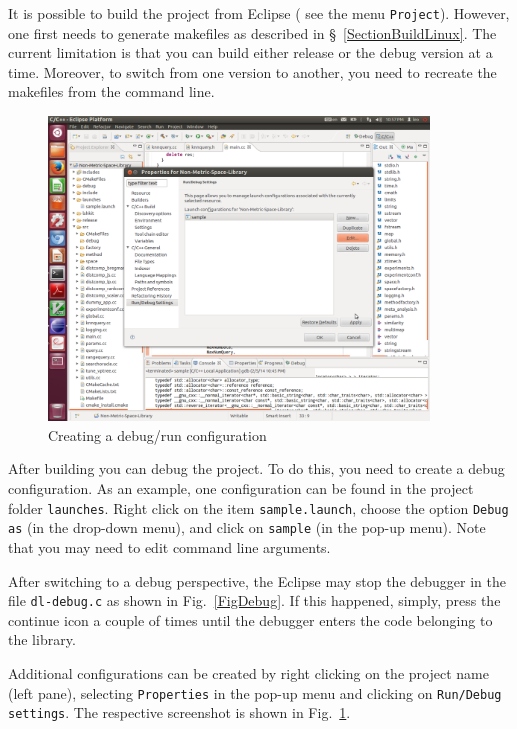 \documentclass[runningheads,a4paper]{llncs}
\newcommand{\ttt}[1]{\texttt{#1}}
\begin{document}
{It is possible to build the project from Eclipse (
see the menu \ttt{Project}).
However, one first needs to generate makefiles as described in \S~\ref{SectionBuildLinux}.
The current limitation is that you can build either release
or the debug version at a time.
Moreover, to switch from one version to another, you need to recreate
the makefiles from the command line.

\begin{figure}
\centering
\caption{\label{FigDebugConf}Creating a debug/run configuration}
\includegraphics[width=0.9\textwidth]{figures/EclipseDebugConf.pdf}
\end{figure}

After building you can debug the project.
To do this, you need to create a debug configuration.
As an example, one configuration can be found in the 
project folder \ttt{launches}.
Right click on the item \ttt{sample.launch},
choose the option \ttt{Debug as} (in the drop-down menu),
and click on \ttt{sample} (in the pop-up menu).
Note that you may need to edit command line arguments.

After switching to a debug perspective,
the Eclipse may stop the debugger in 
the file \ttt{dl-debug.c} as shown in Fig.~\ref{FigDebug}.
If this happened, simply, press the continue icon a couple of
times until the debugger enters the code belonging to the library.

Additional configurations can be created by right clicking
on the project name (left pane), selecting \ttt{Properties}
in the pop-up menu and clicking on \ttt{Run/Debug settings}. 
The respective screenshot is shown in Fig.~\ref{FigDebugConf}.


}
\end{document}
